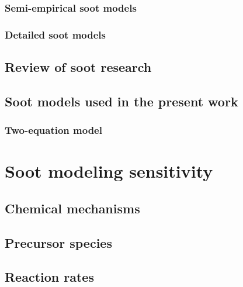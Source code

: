 \subsubsection{Semi-empirical soot models}



\subsubsection{Detailed soot models}



\subsection{Review of soot research}



\subsection{Soot models used in the present work} \label{2Eq_sootModel}

\subsubsection{Two-equation model} 
  
  
  
\section{Soot modeling sensitivity}

\subsection{Chemical mechanisms}


\subsection{Precursor species}



\subsection{Reaction rates}
